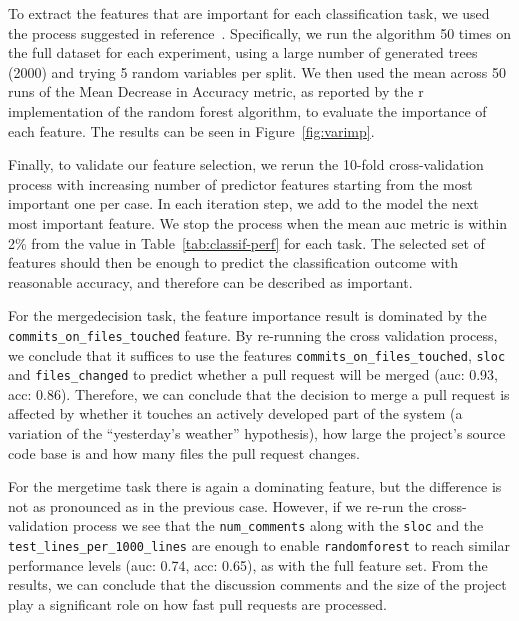 \documentclass{acm_proc_article-sp}
\begin{document}
To extract the features that are important for each classification task, we
used the process suggested in reference~\cite{Genue10}. Specifically, we run
the algorithm 50 times on the full dataset for each experiment, using a large
number of generated trees (2000) and trying 5 random variables per split. We
then used the mean across 50 runs of the  Mean Decrease in Accuracy metric, as
reported by the {\sc r} implementation of the random forest algorithm, to
evaluate the importance of each feature. The results can be seen in
Figure~\ref{fig:varimp}.

Finally, to validate our feature selection, we rerun the 10-fold
cross-validation process with increasing number of predictor features starting
from the most important one per case.
In each iteration step, we add to the model the next most important feature.
We stop the process when the mean {\sc
auc} metric is within 2\% from the value in Table~\ref{tab:classif-perf} for
each task. The selected set of features should then be enough to predict the
classification outcome with reasonable accuracy, and therefore can be described
as important.

For the \textsf{mergedecision} task, the feature importance result is dominated
by the \texttt{commits\_\-on\_\-files\_\-touched} feature. By re-running the cross
validation process, we conclude that it suffices to use the features
 \texttt{commits\_\-on\_\-files\_\-touched}, \texttt{sloc} and \texttt{files\_changed}
to predict whether a pull request will be merged ({\sc auc:} 0.93, {\sc acc}:
0.86). Therefore, we can conclude that the decision to merge a pull request is
affected by whether it touches an actively developed part of the system (a
variation of the ``yesterday's weather'' hypothesis), how large the project's
source code base is and how many files the pull request changes.


For the \textsf{mergetime} task there is again a dominating feature, but the
difference is not as pronounced as in the previous case. However, if we re-run
the cross-validation process we see that the \texttt{num\_comments} along with
the \texttt{sloc} and the \texttt{test\_lines\_per\_1000\_lines} are enough to
enable \texttt{randomforest} to reach similar performance levels ({\sc auc:}
0.74, {\sc acc}: 0.65), as with the full feature set. From the results, we can
conclude that the discussion comments and the size of the project play a
significant role on how fast pull requests are processed. 
\end{document}
